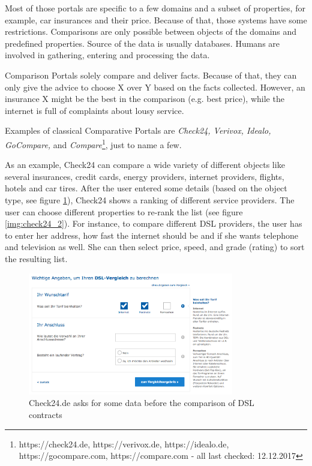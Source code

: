 Most of those portals are specific to a few domains and a subset of properties, for example, car insurances and their price. Because of that, those systems have some restrictions. Comparisons are only possible between objects of the domains and predefined properties. Source of the data is usually databases. Humans are involved in gathering, entering and processing the data.

Comparison Portals solely compare and deliver facts. Because of that, they can only give the advice to choose X over Y based on the facts collected.  However, an insurance X might be the best in the comparison (e.g. best price), while the internet is full of complaints about lousy service.\newline

Examples of classical Comparative Portals are \emph{Check24, Verivox, Idealo, GoCompare,} and \emph{Compare}\footnote{https://check24.de, https://verivox.de, https://idealo.de, https://gocompare.com, https://compare.com - all last checked: 12.12.2017}, just to name a few.

As an example, Check24 can compare a wide variety of different objects like several insurances, credit cards, energy providers, internet providers, flights, hotels and car tires. After the user entered some details (based on the object type, see figure \ref{img:check24_1}), Check24 shows a ranking of different service providers. The user can choose different properties to re-rank the list (see figure \ref{img:check24_2}).
For instance, to compare different DSL providers, the user has to enter her address, how fast the internet should be and if she wants telephone and television as well. She can then select price, speed, and grade (rating) to sort the resulting list.

\begin{figure}[h]
 \centering
	\includegraphics[width=0.8\textwidth]{images/ds-sys/check24_1}
	\caption{Check24.de asks for some data before the comparison of DSL contracts}
		\label{img:check24_1}
\end{figure}


